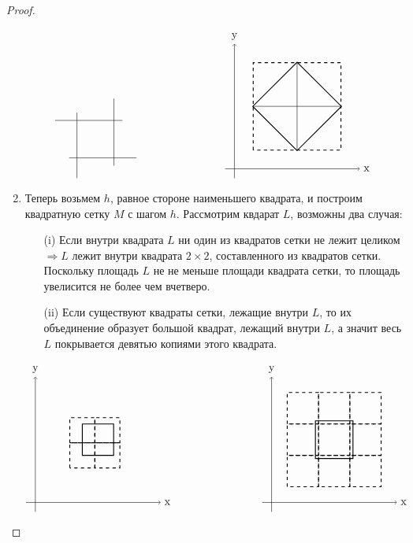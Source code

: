 \begin{proof}
\begin{enumerate}
\[\begin{tikzpicture}
            \draw[-] (0.7, 2.6) -- (2.85, 2.6);
            \draw[-] (1.15, 1.4) -- (3.3, 1.4);
            \draw[-] (1.4, 0.75) -- (1.4, 2.85);
            \draw[-] (2.58, 1.15) -- (2.58, 3.3);
        \end{tikzpicture}
        \tab[80pt]
        \begin{tikzpicture}
            \draw[->] (-0.3, 0) -- (4, 0) node[right] {x};
            \draw[->] (0, -0.3) -- (0, 4) node[above] {y};
            \draw[thick, rotate around={45:(2,2)}] (1, 1) rectangle (3, 3);
            \draw[thick, dashed] (0.6, 0.6) rectangle (3.4, 3.4);
            \draw[-] (2, 0.6) -- (2, 3.4);
            \draw[-] (0.6, 2) -- (3.4, 2);
        \end{tikzpicture}
        \]
        \item Теперь возьмем $h$, равное стороне наименьшего квадрата, и построим квадратную сетку $M$ с шагом $h$. Рассмотрим квдарат $L$, возможны два случая:
        \begin{itemize}
            \item[(i)] Если внутри квадрата $L$ ни один из квадратов сетки не лежит целиком $\Rightarrow L$ лежит внутри квадрата $2\times 2$, составленного из квадратов сетки. Поскольку площадь $L$ не не меньше площади квадрата сетки, то площадь увелисится не более чем вчетверо.
            \item[(ii)] Если существуют квадраты сетки, лежащие внутри $L$, то их объединение образует большой квадрат, лежащий внутри $L$, а значит весь $L$ покрывается девятью копиями этого квадрата.
        \end{itemize}
        \[
        \begin{tikzpicture}
            \draw[->] (-0.3, 0) -- (4, 0) node[right] {x};
            \draw[->] (0, -0.3) -- (0, 4) node[above] {y};
            \draw[thick] (1.5, 1.5) rectangle (2.5, 2.5);
            \draw[thick, dashed] (1.1, 1.1) rectangle (1.9, 1.9);
            \draw[thick, dashed] (1.1, 1.9) rectangle (1.9, 2.7);
            \draw[thick, dashed] (1.9, 1.1) rectangle (2.7, 1.9);
            \draw[thick, dashed] (1.9, 1.9) rectangle (2.7, 2.7);
        \end{tikzpicture}
        \tab[80pt]
        \begin{tikzpicture}
            \draw[->] (-0.3, 0) -- (4, 0) node[right] {x};
            \draw[->] (0, -0.3) -- (0, 4) node[above] {y};
            \draw[thick, dashed] (1.5, 1.5) rectangle (2.5, 2.5);
            \draw[thick] (1.4, 1.4) rectangle (2.6, 2.6);
            \draw[thick, dashed] (0.5, 0.5) rectangle (1.5, 1.5);
            \draw[thick, dashed] (0.5, 1.5) rectangle (1.5, 2.5);
            \draw[thick, dashed] (0.5, 2.5) rectangle (1.5, 3.5);
            \draw[thick, dashed] (1.5, 2.5) rectangle (2.5, 3.5);
            \draw[thick, dashed] (2.5, 2.5) rectangle (3.5, 3.5);
            \draw[thick, dashed] (1.5, 0.5) rectangle (2.5, 1.5);
            \draw[thick, dashed] (2.5, 0.5) rectangle (3.5, 1.5);
            \draw[thick, dashed] (2.5, 1.5) rectangle (3.5, 2.5);


\end{tikzpicture}\]
\end{enumerate}
\end{proof}

